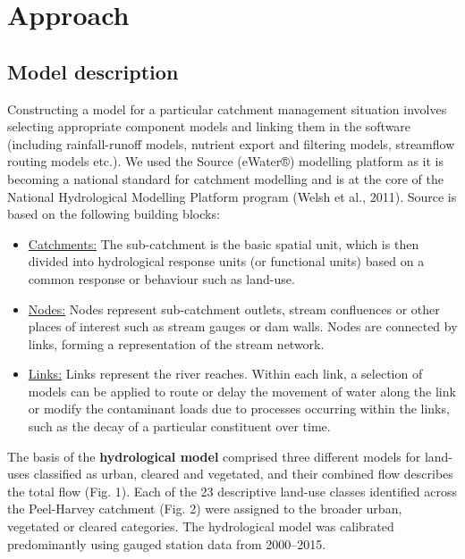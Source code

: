 \documentclass[
]{book}
\begin{document}
\hypertarget{approach-5}{%
\section{Approach}\label{approach-5}}

\hypertarget{model-description}{%
\subsection{Model description}\label{model-description}}

Constructing a model for a particular catchment management situation involves selecting appropriate component models and linking them in the software (including rainfall-runoff models, nutrient export and filtering models, streamflow routing models etc.). We used the Source (eWater®) modelling platform as it is becoming a national standard for catchment modelling and is at the core of the National Hydrological Modelling Platform program (Welsh et al., 2011). Source is based on the following building blocks:

\begin{itemize}
\item
  \underline{Catchments:} The sub-catchment is the basic spatial unit, which is then divided into hydrological response units (or functional units) based on a common response or behaviour such as land-use.
\item
  \underline{Nodes:} Nodes represent sub-catchment outlets, stream confluences or other places of interest such as stream gauges or dam walls. Nodes are connected by links, forming a representation of the stream network.~
\item
  \underline{Links:} Links represent the river reaches. Within each link, a selection of models can be applied to route or delay the movement of water along the link or modify the contaminant loads due to processes occurring within the links, such as the decay of a particular constituent over time.
\end{itemize}

The basis of the \textbf{hydrological model} comprised three different models for land-uses classified as urban, cleared and vegetated, and their combined flow describes the total flow (Fig. 1). Each of the 23 descriptive land-use classes identified across the Peel-Harvey catchment (Fig. 2) were assigned to the broader urban, vegetated or cleared categories. The hydrological model was calibrated predominantly using gauged station data from 2000--2015.
\end{document}
